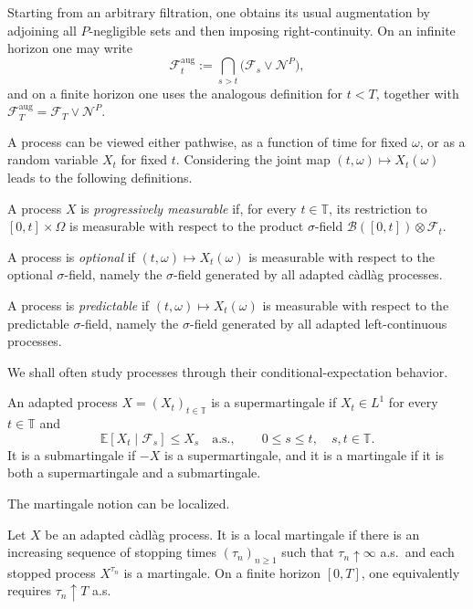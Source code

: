 \begin{remark}
Starting from an arbitrary filtration, one obtains its usual augmentation by adjoining all \(P\)-negligible sets and then imposing right-continuity. On an infinite horizon one may write
\[
\mathcal F_t^{\mathrm{aug}}
:=\bigcap_{s>t}\bigl(\mathcal F_s\vee\mathcal N^P\bigr),
\]
and on a finite horizon one uses the analogous definition for \(t<T\), together with \(\mathcal F_T^{\mathrm{aug}}=\mathcal F_T\vee\mathcal N^P\).
\end{remark}

A process can be viewed either pathwise, as a function of time for fixed \(\omega\), or as a random variable \(X_t\) for fixed \(t\). Considering the joint map \((t,\omega)\mapsto X_t(\omega)\) leads to the following definitions.

\begin{de}
A process \(X\) is \emph{progressively measurable} if, for every \(t\in\mathbb T\), its restriction to \([0,t]\times\Omega\) is measurable with respect to the product \(\sigma\)-field \(\mathcal B([0,t])\otimes\mathcal F_t\).

A process is \emph{optional} if \((t,\omega)\mapsto X_t(\omega)\) is measurable with respect to the optional \(\sigma\)-field, namely the \(\sigma\)-field generated by all adapted c\`adl\`ag processes.

A process is \emph{predictable} if \((t,\omega)\mapsto X_t(\omega)\) is measurable with respect to the predictable \(\sigma\)-field, namely the \(\sigma\)-field generated by all adapted left-continuous processes.
\end{de}

We shall often study processes through their conditional-expectation behavior.

\begin{de}
An adapted process \(X=(X_t)_{t\in\mathbb T}\) is a supermartingale if \(X_t\in L^1\) for every \(t\in\mathbb T\) and
\[
\mathbb E[X_t\mid\mathcal F_s]\le X_s
\quad\text{a.s.},
\qquad 0\le s\le t,
\quad s,t\in\mathbb T.
\]
It is a submartingale if \(-X\) is a supermartingale, and it is a martingale if it is both a supermartingale and a submartingale.
\end{de}

The martingale notion can be localized.

\begin{de}
Let \(X\) be an adapted c\`adl\`ag process. It is a local martingale if there is an increasing sequence of stopping times \((\tau_n)_{n\ge1}\) such that \(\tau_n\uparrow\infty\) a.s.\ and each stopped process \(X^{\tau_n}\) is a martingale. On a finite horizon \([0,T]\), one equivalently requires \(\tau_n\uparrow T\) a.s.
\end{de}

